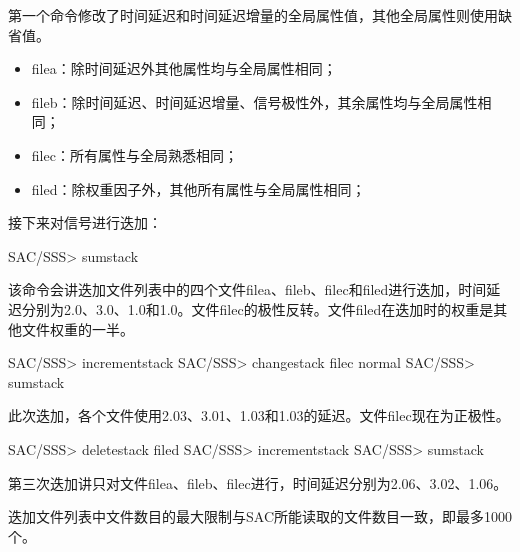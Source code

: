 第一个命令修改了时间延迟和时间延迟增量的全局属性值，其他全局属性则使用缺省值。
\begin{itemize}
\item filea：除时间延迟外其他属性均与全局属性相同；
\item fileb：除时间延迟、时间延迟增量、信号极性外，其余属性均与全局属性相同；
\item filec：所有属性与全局熟悉相同；
\item filed：除权重因子外，其他所有属性与全局属性相同；
\end{itemize}

接下来对信号进行迭加：
\begin{SACCode}
SAC/SSS> sumstack
\end{SACCode}

该命令会讲迭加文件列表中的四个文件filea、fileb、filec和filed进行迭加，时间延迟分别为2.0、3.0、1.0和1.0。文件filec的极性反转。文件filed在迭加时的权重是其他文件权重的一半。

\begin{SACCode}
SAC/SSS> incrementstack
SAC/SSS> changestack filec normal
SAC/SSS> sumstack
\end{SACCode}

此次迭加，各个文件使用2.03、3.01、1.03和1.03的延迟。文件filec现在为正极性。

\begin{SACCode}
SAC/SSS> deletestack filed
SAC/SSS> incrementstack
SAC/SSS> sumstack
\end{SACCode}

第三次迭加讲只对文件filea、fileb、filec进行，时间延迟分别为2.06、3.02、1.06。

迭加文件列表中文件数目的最大限制与SAC所能读取的文件数目一致，即最多1000个。
